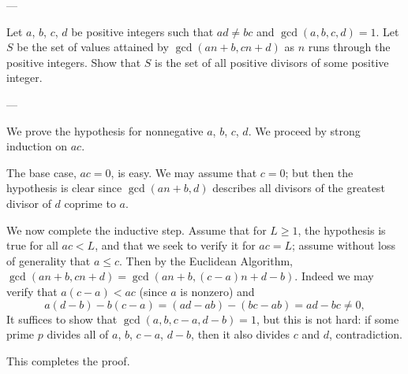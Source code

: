 
---

Let $a$, $b$, $c$, $d$ be positive integers such that $ad\ne bc$ and $\gcd(a,b,c,d)=1$. Let $S$ be the set of values attained by $\gcd(an+b,cn+d)$ as $n$ runs through the positive integers. Show that $S$ is the set of all positive divisors of some positive integer.

---

We prove the hypothesis for nonnegative $a$, $b$, $c$, $d$. We proceed by strong induction on $ac$.

The base case, $ac=0$, is easy. We may assume that $c=0$; but then the hypothesis is clear since $\gcd(an+b,d)$ describes all divisors of the greatest divisor of $d$ coprime to $a$.

We now complete the inductive step. Assume that for $L\ge1$, the hypothesis is true for all $ac<L$, and that we seek to verify it for $ac=L$; assume without loss of generality that $a\le c$. Then by the Euclidean Algorithm, $\gcd(an+b,cn+d)=\gcd(an+b,(c-a)n+d-b)$. Indeed we may verify that $a(c-a)<ac$ (since $a$ is nonzero) and \[a(d-b)-b(c-a)=(ad-ab)-(bc-ab)=ad-bc\ne0,\]
It suffices to show that $\gcd(a,b,c-a,d-b)=1$, but this is not hard: if some prime $p$ divides all of $a$, $b$, $c-a$, $d-b$, then it also divides $c$ and $d$, contradiction.

This completes the proof.
